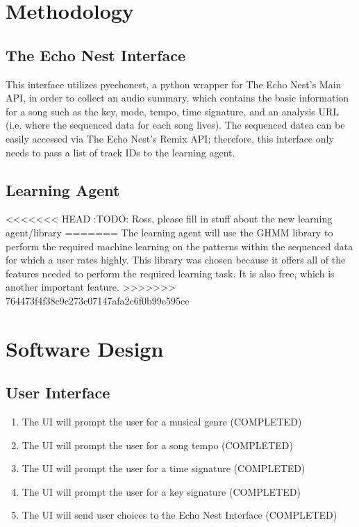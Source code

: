 \documentclass{article}
\begin{document}
\section{Methodology}
\subsection{The Echo Nest Interface}
This interface utilizes pyechonest, a python wrapper for The Echo Nest's Main API, in order to collect an 
audio summary, which contains the basic information for a song such as the key, mode, tempo, time signature, 
and an analysis URL (i.e. where the sequenced data for each song lives). The sequenced datea
can be easily accessed via The Echo Nest's Remix API; therefore, this interface only needs to pass a list of
track IDs to the learning agent.

\subsection{Learning Agent}
<<<<<<< HEAD
\Large:{TODO: Ross, please fill in stuff about the new learning agent/library}
=======
The learning agent will use the GHMM library \cite{GHMM} to perform the required machine learning on the 
patterns within the sequenced data for which a user rates highly. This library was chosen because it offers 
all of the features needed to perform the required learning task. It is also free, which is another important 
feature.
>>>>>>> 764473f4f38c9c273c07147afa2c6f0b99e595ce

\section{Software Design}
\subsection{User Interface}
\begin{enumerate}
\item The UI will prompt the user for a musical genre (COMPLETED)
\item The UI will prompt the user for a song tempo (COMPLETED)
\item The UI will prompt the user for a time signature (COMPLETED)
\item The UI will prompt the user for a key signature (COMPLETED)
\item The UI will send user choices to the Echo Nest Interface (COMPLETED)
\end{enumerate}
\end{document}
